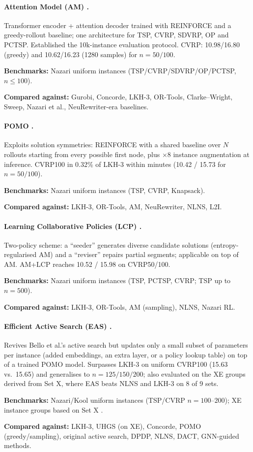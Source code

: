 \documentclass[11pt]{article}
\newcommand{\benchline}[1]{\par\smallskip\noindent\textbf{Benchmarks:} #1}
\newcommand{\baseline}[1]{\par\noindent\textbf{Compared against:} #1}
\begin{document}
\paragraph{Attention Model (AM) \citep{kool_attention_2018}.}
Transformer encoder + attention decoder trained with REINFORCE and a greedy-rollout
baseline; one architecture for TSP, CVRP, SDVRP, OP and PCTSP. Established the
10k-instance evaluation protocol. CVRP: 10.98/16.80 (greedy) and 10.62/16.23 (1280
samples) for $n{=}50/100$.
\benchline{Nazari uniform instances (TSP/CVRP/SDVRP/OP/PCTSP, $n\le100$).}
\baseline{Gurobi, Concorde, LKH-3, OR-Tools, Clarke--Wright, Sweep, Nazari et al.,
NeuRewriter-era baselines.}

\paragraph{POMO \citep{kwon_pomo_2020}.}
Exploits solution symmetries: REINFORCE with a shared baseline over $N$ rollouts starting
from every possible first node, plus $\times 8$ instance augmentation at inference.
CVRP100 in 0.32\% of LKH-3 within minutes (10.42 / 15.73 for $n{=}50/100$).
\benchline{Nazari uniform instances (TSP, CVRP, Knapsack).}
\baseline{LKH-3, OR-Tools, AM, NeuRewriter, NLNS, L2I.}

\paragraph{Learning Collaborative Policies (LCP) \citep{kim_learning_2021}.}
Two-policy scheme: a ``seeder'' generates diverse candidate solutions (entropy-regularised
AM) and a ``reviser'' repairs partial segments; applicable on top of AM. AM+LCP reaches
10.52 / 15.98 on CVRP50/100.
\benchline{Nazari uniform instances (TSP, PCTSP, CVRP; TSP up to $n{=}500$).}
\baseline{LKH-3, OR-Tools, AM (sampling), NLNS, Nazari RL.}

\paragraph{Efficient Active Search (EAS) \citep{hottung_efficient_2021}.}
Revives Bello et al.'s active search but updates only a small subset of parameters per
instance (added embeddings, an extra layer, or a policy lookup table) on top of a trained
POMO model. Surpasses LKH-3 on uniform CVRP100 (15.63 vs.\ 15.65) and generalises to
$n=125/150/200$; also evaluated on the XE groups derived from Set X, where EAS beats NLNS
and LKH-3 on 8 of 9 sets.
\benchline{Nazari/Kool uniform instances (TSP/CVRP $n{=}100$--$200$); XE instance groups
based on Set X \citep{hottung_andre_neural_2020}.}
\baseline{LKH-3, UHGS (on XE), Concorde, POMO (greedy/sampling), original active search,
DPDP, NLNS, DACT, GNN-guided methods.}
\end{document}
